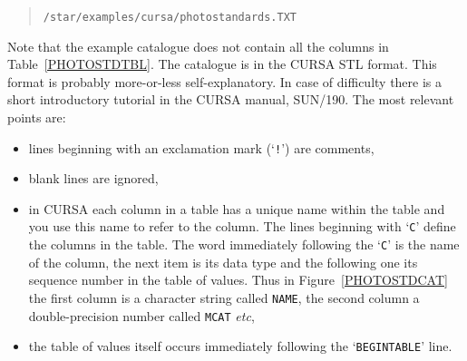 \documentclass[twoside,11pt]{article}
\newcommand{\xref}[3]{#1}
\begin{document}
\begin{enumerate}
\begin{description}
    \begin{verse}
     {\tt /star/examples/cursa/photostandards.TXT}
    \end{verse}

     Note that the example catalogue does not contain all the columns
     in Table~\ref{PHOTOSTDTBL}.  The catalogue is in the CURSA STL
     format.  This format is probably more-or-less self-explanatory.  In
     case of difficulty there is a short introductory tutorial in the CURSA
     manual, \xref{SUN/190}{sun190}{}\cite{SUN190}.  The most relevant points
     are:

    \begin{itemize}

      \item lines beginning with an exclamation mark (`{\tt !}') are
       comments,

      \item blank lines are ignored,

      \item in CURSA each column in a table has a unique name within
       the table and you use this name to refer to the column.  The
       lines beginning with `{\tt C}' define the columns in the table.
       The word immediately following the `{\tt C}' is the name of the
       column, the next item is its data type and the following one its
       sequence number in the table of values.  Thus in
       Figure~\ref{PHOTOSTDCAT} the first column is a character string
       called {\tt NAME}, the second column a double-precision number
       called {\tt MCAT} \emph{etc},

      \item the table of values itself occurs immediately following the
       `{\tt BEGINTABLE}' line.

    \end{itemize}


\end{description}
\end{enumerate}
\end{document}
